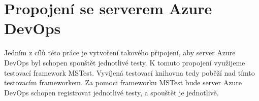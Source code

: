 

\section{Propojení se serverem Azure DevOps}
Jedním z cílů této práce je vytvoření takového připojení, aby server Azure DevOps byl schopen spouštět jednotlivé testy. K tomuto propojení využijeme testovací framework MSTest. Vyvíjená testovací knihovna tedy poběží nad tímto testovacím frameworkem. Za pomoci frameworku MSTest bude server Azure DevOps schopen registrovat jednotlivé testy, a spouštět je jednotlivě.

